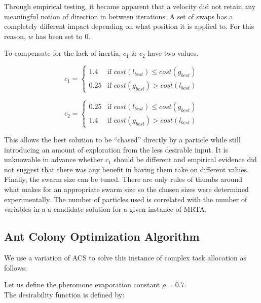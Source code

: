 \documentclass[a4paper]{article}
\begin{document}
Through empirical testing, it became apparent that a velocity did not retain any meaningful notion of direction in between iterations. A set of swaps has a completely different impact depending on what position it is applied to. For this reason, $w$ has been set to 0.

To compensate for the lack of inertia, $c_1$ \& $c_2$ have two values.

$$
c_1 =
\begin{cases}
1.4 & \text{if } \mathit{cost}(l_\mathit{best}) \leq \mathit{cost}(g_\mathit{best})\\
0.25 & \text{if } \mathit{cost}(g_\mathit{best}) > \mathit{cost}(l_\mathit{best})
\end{cases}
$$

$$
c_2 =
\begin{cases}
0.25 & \text{if } \mathit{cost}(l_\mathit{best}) \leq \mathit{cost}(g_\mathit{best})\\
1.4 & \text{if } \mathit{cost}(g_\mathit{best}) > \mathit{cost}(l_\mathit{best})
\end{cases}
$$

This allows the best solution to be ``chased'' directly by a particle while still introducing an amount of exploration from the less desirable input. It is unknowable in advance whether $c_1$ should be different and empirical evidence did not suggest that there was any benefit in having them take on different values. \cite{PermutationPSO}\\

Finally, the swarm size can be tuned. There are only rules of thumbs around what makes for an appropriate swarm size so the chosen sizes were determined experimentally. The number of particles used is correlated with the number of variables in a a candidate solution for a given instance of MRTA. \cite{PermutationPSO}

\subsection{Ant Colony Optimization Algorithm} %

We use a variation of ACS to solve this instance of complex task allocation as follows:

Let us define the pheromone evaporation constant $\rho=0.7$.\\
The desirability function is defined by:
\end{document}
